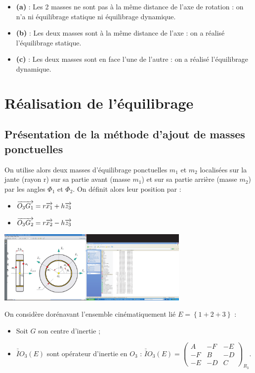 \documentclass[10pt,fleqn]{article} %
\begin{document}
\begin{itemize}
\item \textbf{(a)} : Les 2 masses ne sont pas à la même distance de l'axe de rotation : on n'a ni équilibrage statique ni équilibrage dynamique.
\item \textbf{(b)} : Les deux masses sont à la même distance de l'axe : on a réalisé l'équilibrage statique.
\item \textbf{(c)} : Les deux masses sont en face l'une de l'autre : on a réalisé l'équilibrage dynamique.
\end{itemize}


\section{Réalisation de l'équilibrage}
\subsection{Présentation de la méthode d'ajout de masses ponctuelles}
On utilise alors deux masses d'équilibrage ponctuelles $m_1$ et $m_2$ localisées sur la jante (rayon r) sur sa partie avant (masse $m_1$) et sur sa partie arrière (masse $m_2$) par les angles $\Phi_1$ et $\Phi_2$.
On définit alors leur position par :
\begin{itemize}
\item $\overrightarrow{O_3G_1}=r \overrightarrow{x_1}+h\overrightarrow{z_3}$
\item $\overrightarrow{O_3G_2}=r \overrightarrow{x_2}-h\overrightarrow{z_3}$
\end{itemize}


\begin{center}
\includegraphics[width=0.7\textwidth]{images/figure-masse-roue.pdf}
\end{center}

On considère dorénavant l'ensemble cinématiquement lié $E=\left\{1+2+3\right\}$ : 
\begin{itemize}
\item Soit $G$ son centre d'inertie ;
\item $\overline{\overline{I}}{O_3}(E)$ sont opérateur d'inertie en $O_3$ :
$
\overline{\overline{I}}{O_3}(E)=
\left(\begin{array}{ccc}
A & -F & -E \\ 
-F & B & -D \\ 
-E & -D & C
\end{array} \right)_{R_3}
$.
\end{itemize}
\end{document}
